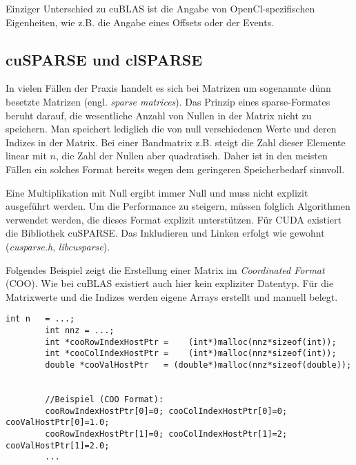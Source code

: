 		Einziger Unterschied zu cuBLAS ist die Angabe von OpenCl-spezifischen Eigenheiten, wie z.B. die Angabe eines Offsets oder	
der Events.
		
		\subsection{cuSPARSE und clSPARSE}
		In vielen Fällen der Praxis handelt es sich bei Matrizen um sogenannte dünn besetzte Matrizen (engl. \textit{sparse matrices}). Das Prinzip eines sparse-Formates beruht darauf, die wesentliche Anzahl von Nullen in der Matrix nicht zu speichern. Man speichert lediglich die von null verschiedenen Werte und deren Indizes in der Matrix. Bei einer Bandmatrix z.B. steigt die Zahl dieser Elemente linear mit $n$, die Zahl der Nullen aber quadratisch. Daher ist in den meisten Fällen ein solches Format bereits wegen dem geringeren Speicherbedarf sinnvoll. 
		
		Eine Multiplikation mit Null ergibt immer Null und muss nicht explizit ausgeführt werden. Um die Performance zu steigern, müssen folglich Algorithmen verwendet werden, die dieses Format explizit unterstützen. Für CUDA existiert die Bibliothek cuSPARSE. Das Inkludieren und Linken erfolgt wie gewohnt (\textit{cusparse.h}, \textit{libcusparse}).
		
		Folgendes Beispiel zeigt die Erstellung einer Matrix im \textit{Coordinated Format} (COO). Wie bei cuBLAS existiert auch hier kein expliziter Datentyp. Für die Matrixwerte und die Indizes werden eigene Arrays erstellt und manuell belegt.	
		\begin{lstlisting}[caption=cuSPARSE: Matrix erstellen]
		int n   = ...;
		int nnz = ...;
		int *cooRowIndexHostPtr =    (int*)malloc(nnz*sizeof(int));
		int *cooColIndexHostPtr =    (int*)malloc(nnz*sizeof(int));
		double *cooValHostPtr   = (double*)malloc(nnz*sizeof(double));


		//Beispiel (COO Format): 
		cooRowIndexHostPtr[0]=0; cooColIndexHostPtr[0]=0; cooValHostPtr[0]=1.0;
		cooRowIndexHostPtr[1]=0; cooColIndexHostPtr[1]=2; cooValHostPtr[1]=2.0;
		...		
		\end{lstlisting}

